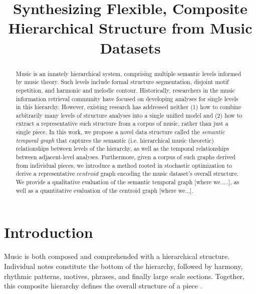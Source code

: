 \documentclass{article}
\title{Synthesizing Flexible, Composite Hierarchical Structure from Music Datasets}
\begin{document}
%
\maketitle
%


\begin{abstract}
Music is an innately hierarchical system, comprising multiple semantic levels informed by music theory. Such levels include formal structure segmentation, disjoint motif repetition, and harmonic and melodic contour. Historically, researchers in the music information retrieval community have focused on developing analyses for single levels in this hierarchy. However, existing research has addressed neither (1) how to combine arbitrarily many levels of structure analyses into a single unified model and (2) how to extract a representative such structure from a corpus of music, rather than just a single piece. In this work, we propose a novel data structure called the \textit{semantic temporal graph} that captures the semantic (i.e. hierarchical music theoretic) relationships between levels of the hierarchy, as well as the temporal relationships between adjacent-level analyses. Furthermore, given a corpus of such graphs derived from individual pieces, we introduce a method rooted in stochastic optimization to derive a representative $centroid$ graph encoding the music dataset's overall structure. We provide a qualitative evaluation of the semantic temporal graph [where we.....], as well as a quantitative evaluation of the centroid graph [where we...].
\end{abstract}


%
\section{Introduction}\label{sec:intro}
Music is both composed and comprehended with a hierarchical structure. Individual notes constitute the bottom of the hierarchy, followed by harmony, rhythmic patterns, motives, phrases, and finally large scale sections. Together, this composite hierarchy defines the overall structure of a piece \cite{msaf}.
\end{document}
